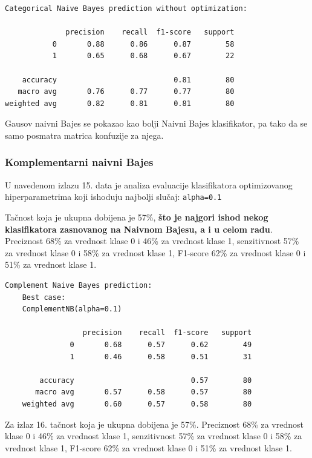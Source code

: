 \documentclass[fontsize=12bp, paper=a4]{scrarticle}
\begin{document}
\begin{lstlisting}[caption=Kategorički naivni Bajes bez optimizacijom hiperparametara]
Categorical Naive Bayes prediction without optimization:

              precision    recall  f1-score   support
           0       0.88      0.86      0.87        58
           1       0.65      0.68      0.67        22

    accuracy                           0.81        80
   macro avg       0.76      0.77      0.77        80
weighted avg       0.82      0.81      0.81        80
\end{lstlisting}
Gausov naivni Bajes se pokazao kao bolji Naivni Bajes klasifikator, pa tako da se samo posmatra matrica konfuzije za njega.

\subsubsection{Komplementarni naivni Bajes}

U navedenom izlazu 15. data je analiza evaluacije klasifikatora 
 optimizovanog hiperparametrima koji ishoduju najbolji slučaj: \verb|alpha=0.1|
 
 Tačnost koja je ukupna dobijena je 57\%, \textbf{što je najgori ishod nekog klasifikatora zasnovanog na Naivnom Bajesu, a i u celom radu}. Preciznost 68\% za vrednost klase 0 i 46\% za vrednost klase 1, senzitivnost 57\% za vrednost klase 0 i 58\% za vrednost klase 1, F1-score 62\% za vrednost klase 0 i 51\% za vrednost klase 1.

\begin{lstlisting}[caption=Komplementarni naivni Bajes sa optimizacijom hiperparametara]
    Complement Naive Bayes prediction:
    Best case:
    ComplementNB(alpha=0.1)
    
                  precision    recall  f1-score   support
               0       0.68      0.57      0.62        49
               1       0.46      0.58      0.51        31
    
        accuracy                           0.57        80
       macro avg       0.57      0.58      0.57        80
    weighted avg       0.60      0.57      0.58        80
\end{lstlisting}

Za izlaz 16. tačnost koja je ukupna dobijena je 57\%. Preciznost 68\% za vrednost klase 0 i 46\% za vrednost klase 1, senzitivnost 57\% za vrednost klase 0 i 58\% za vrednost klase 1, F1-score 62\% za vrednost klase 0 i 51\% za vrednost klase 1.
\end{document}
